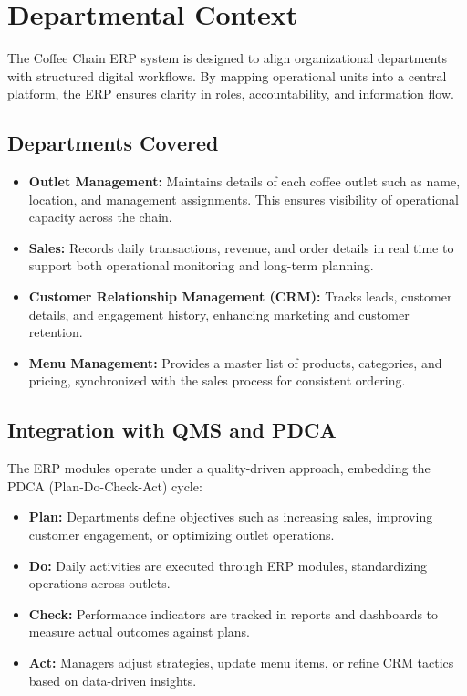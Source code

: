 \chapter{Departmental Context}

The Coffee Chain ERP system is designed to align organizational departments with structured digital workflows. By mapping operational units into a central platform, the ERP ensures clarity in roles, accountability, and information flow.

\section*{Departments Covered}
\begin{itemize}
    \item \textbf{Outlet Management:} Maintains details of each coffee outlet such as name, location, and management assignments. This ensures visibility of operational capacity across the chain.
    \item \textbf{Sales:} Records daily transactions, revenue, and order details in real time to support both operational monitoring and long-term planning.
    \item \textbf{Customer Relationship Management (CRM):} Tracks leads, customer details, and engagement history, enhancing marketing and customer retention.
    \item \textbf{Menu Management:} Provides a master list of products, categories, and pricing, synchronized with the sales process for consistent ordering.
\end{itemize}

\section*{Integration with QMS and PDCA}
The ERP modules operate under a quality-driven approach, embedding the PDCA (Plan-Do-Check-Act) cycle:

\begin{itemize}
    \item \textbf{Plan:} Departments define objectives such as increasing sales, improving customer engagement, or optimizing outlet operations.
    \item \textbf{Do:} Daily activities are executed through ERP modules, standardizing operations across outlets.
    \item \textbf{Check:} Performance indicators are tracked in reports and dashboards to measure actual outcomes against plans.
    \item \textbf{Act:} Managers adjust strategies, update menu items, or refine CRM tactics based on data-driven insights.
\end{itemize}

